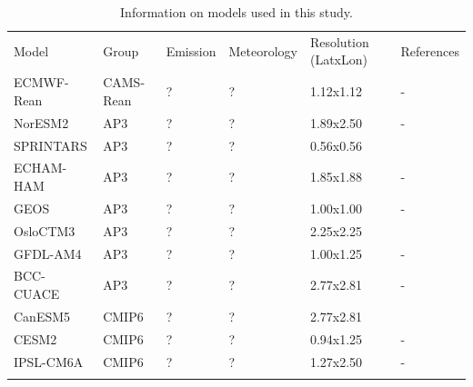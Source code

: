 \documentclass[journal abbreviation, manuscript]{copernicus}
\begin{document}
\begin{table}
 \begin{tabularx}{\textwidth}{lllllX}
  \tophline
  Model      & Group     & Emission & Meteorology & Resolution (LatxLon) & References                                                          \\
  \middlehline
  ECMWF-Rean & CAMS-Rean & ?        & ?           & 1.12x1.12            & -                                                                   \\
  NorESM2    & AP3       & ?        & ?           & 1.89x2.50            & -                                                                   \\
  SPRINTARS  & AP3       & ?        & ?           & 0.56x0.56            & \cite{takemura2000global,takemura2002single,takemura2005simulation} \\
  ECHAM-HAM  & AP3       & ?        & ?           & 1.85x1.88            & -                                                                   \\
  GEOS       & AP3       & ?        & ?           & 1.00x1.00            & -                                                                   \\
  OsloCTM3   & AP3       & ?        & ?           & 2.25x2.25            & \cite{lund2018concentrations,myhre2009modelled}                     \\
  GFDL-AM4   & AP3       & ?        & ?           & 1.00x1.25            & -                                                                   \\
  BCC-CUACE  & AP3       & ?        & ?           & 2.77x2.81            & -                                                                   \\
  CanESM5    & CMIP6     & ?        & ?           & 2.77x2.81            & \cite{gmd-12-4823-2019}                                             \\
  CESM2      & CMIP6     & ?        & ?           & 0.94x1.25            & -                                                                   \\
  IPSL-CM6A  & CMIP6     & ?        & ?           & 1.27x2.50            & -                                                                   \\
  \bottomhline
 \end{tabularx}
 \caption{Information on models used in this study.}
 \label{table:models}
\end{table}
\end{document}
